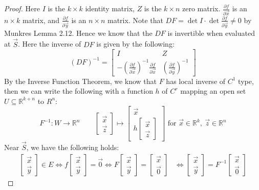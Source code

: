 \documentclass[11pt,oneside]{book}
\theoremstyle{break}
\theoremstyle{break}
\newcommand{\R}{\mathbb{R}}
\begin{document}
\begin{proof}
Here $I$ is the ${k \times k}$ identity matrix, $Z$ is the ${k \times n}$ zero matrix. $\frac{\partial f}{\partial \vec{x}}$ is an ${n \times k}$ matrix, and $\frac{\partial f }{\partial \vec{y}}$ is an ${n \times n}$ matrix. Note that $DF = \det I \cdot \det \frac{\partial f}{\partial \vec{y}} \neq 0$ by Munkres Lemma 2.12. Hence we know that the $DF$ is invertible when evaluated at $\vec{S}$. Here the inverse of $DF$ is given by the following:
$$(DF)^{-1} = \begin{bmatrix}
I & Z \\ -\left(\frac{\partial f}{\partial \vec{x}}\right)^{-1}\frac{\partial f}{\partial \vec{x}} & \left(\frac{\partial f}{\partial \vec{y}}\right)^{-1}
\end{bmatrix}$$
By the Inverse Function Theorem, we know that $F$ has local inverse of $C^{1}$ type, then we can write the following with a function $h$ of $C^r$ mapping an open set $U\subseteq \R^{k+n}$ to $R^n$:
$$F^{-1}: W \to \R^n \qquad \begin{bmatrix}
\vec{x}\\\vec{z}
\end{bmatrix}  \mapsto \begin{bmatrix}
\vec{x} \\ h\begin{bmatrix}
\vec{x} \\ \vec{z}
\end{bmatrix}
\end{bmatrix} \text{\ \ \  for }\vec{x}\in \R^k,\ \vec{z}\in \R^n$$
Near $\vec{S}$, we have the following holds:
\begin{align*}
\begin{bmatrix}
\vec{x}\\\vec{y}
\end{bmatrix}\in E \iff f\begin{bmatrix}
\vec{x}\\\vec{y}
\end{bmatrix} = \vec{0} \iff F\begin{bmatrix}
\vec{x}\\ \vec{y}
\end{bmatrix}  =\begin{bmatrix}
\vec{x} \\ \vec{0}
\end{bmatrix} &\iff \begin{bmatrix}
\vec{x}\\\vec{y}
\end{bmatrix} = F^{-1}\begin{bmatrix}
\vec{x}\\ \vec{0}

\end{bmatrix}
\end{align*}
\end{proof}
\end{document}
